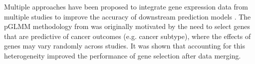 


Multiple approaches have been proposed to integrate gene expression data from multiple studies to improve the accuracy of downstream prediction models \citep{riester2014, ma2018continuity, patil2018}.  The pGLMM methodology from \cite{rashid2020} was originally motivated by the need to select genes that are predictive of cancer outcomes (e.g. cancer subtype), where the effects of genes may vary randomly across studies.  It was shown that accounting for this heterogeneity improved the performance of gene selection after data merging.

